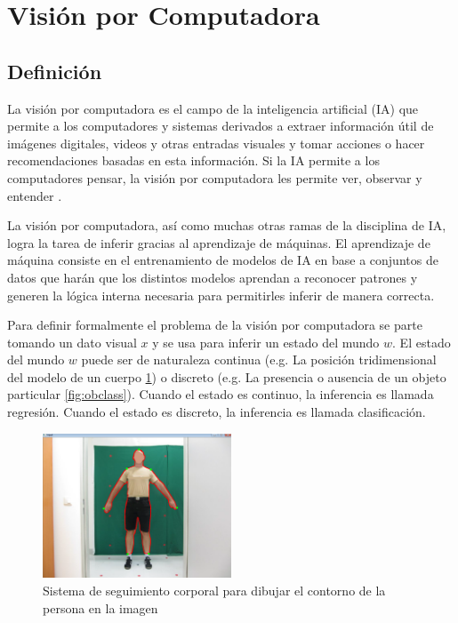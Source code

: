 \documentclass[letter,12pt]{report}
\begin{document}
\section{Visión por Computadora}
\subsection{Definición}
La visión por computadora es el campo de la inteligencia artificial (IA) que permite a
los computadores y sistemas derivados a extraer información útil de imágenes digitales,
videos y otras entradas visuales y tomar acciones o hacer recomendaciones basadas en esta
información. Si la IA permite a los computadores pensar, la visión por computadora les
permite ver, observar y entender \cite{IBM}.

La visión por computadora, así como muchas otras ramas de la disciplina de IA, logra la
tarea de inferir gracias al aprendizaje de máquinas. El aprendizaje de máquina consiste
en el entrenamiento de modelos de IA en base a conjuntos de datos que harán que los
distintos modelos aprendan a reconocer patrones y generen la lógica interna necesaria
para permitirles inferir de manera correcta.

Para definir formalmente el problema de la visión por computadora \cite{Prince} se parte
tomando un dato visual $x$ y se usa para inferir un estado del mundo $w$. El estado
del mundo $w$ puede ser de naturaleza continua (e.g. La posición tridimensional del
modelo de un cuerpo \ref{fig:body}) o discreto (e.g. La presencia o ausencia de un objeto
particular \ref{fig:obclass}).  Cuando el estado es continuo, la inferencia es llamada
regresión. Cuando el estado es discreto, la inferencia es llamada clasificación.

\begin{figure}[H]
    \centering
    \includegraphics[width=0.5\textwidth]{body}
    \caption{Sistema de seguimiento corporal para dibujar el contorno de la persona en la
    imagen}
    \label{fig:body}
\end{figure}
\end{document}
